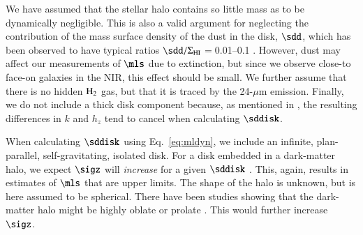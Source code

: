 \documentclass[traditabstract]{aa} %
\begin{document}
We have assumed that the stellar halo contains so little mass as to be 
dynamically negligible. This is also a valid argument for neglecting the contribution of 
the mass surface density of the dust in the disk, $\sdd$, which has been 
observed to have typical ratios $\sdd/\Sigma_{\rm HI}$$=$0.01--0.1 
\citep{magrini2011}. However, dust may affect our measurements of $\mls$ due to
extinction, but since we observe close-to face-on galaxies in the NIR, this effect should
be small. We further assume that there is no hidden $\rm H_2$ gas, but that it is traced
by the 24-$\mu$m emission. Finally, we do not include a thick disk component because, as
mentioned in , the resulting differences in $k$ and $h_z$ tend
to cancel when calculating $\sddisk$.

When calculating $\sddisk$ using Eq.~\ref{eq:mldyn}, we include an infinite,
plan-parallel, self-gravitating, isolated disk. For a disk embedded in a dark-matter
halo, we expect $\sigz$ will {\it increase} for a given $\sddisk$ 
\citep{bottema1993}. This, again, results in estimates of $\mls$ that are upper limits.
The shape of the halo is unknown, but is here assumed to be spherical. There have been
studies showing that the dark-matter halo might be highly oblate or prolate
\citep[e.g.,][]{amorisco2010, vera-ciro2011}.
This would further increase $\sigz$.


\end{document}
